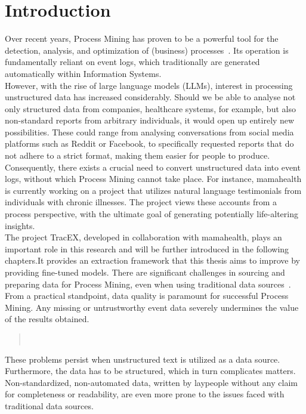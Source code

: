 \section{Introduction}\label{sec:intro}
Over recent years, Process Mining has proven to be a powerful tool for the detection, analysis, and optimization of (business) processes~\cite{weske_business_2012}. Its operation is fundamentally reliant on event logs, which traditionally are generated automatically within Information Systems.\\
However, with the rise of large language models (LLMs), interest in processing unstructured data has increased considerably. Should we be able to analyse not only structured data from companies, healthcare systems, for example, but also non-standard reports from arbitrary individuals, it would open up entirely new possibilities. These could range from analysing conversations from social media platforms such as Reddit or Facebook, to specifically requested reports that do not adhere to a strict format, making them easier for people to produce.\\
Consequently, there exists a crucial need to convert unstructured data into event logs, without which Process Mining cannot take place. For instance, mamahealth is currently working on a project that utilizes natural language testimonials from individuals with chronic illnesses. The project views these accounts from a process perspective, with the ultimate goal of generating potentially life-altering insights.\\
The project TracEX, developed in collaboration with mamahealth, plays an important role in this research and will be further introduced in the following chapters.It provides an extraction framework that this thesis aims to improve by providing fine-tuned models. There are significant challenges in sourcing and preparing data for Process Mining, even when using traditional data sources~\cite{van_der_aalst_process_2016}. From a practical standpoint, data quality is paramount for successful Process Mining. Any missing or untrustworthy event data severely undermines the value of the results obtained. 
\begin{quote}
    ~\cite{van_der_aalst_process_2016}    
\end{quote}
These problems persist when unstructured text is utilized as a data source. Furthermore, the data has to be structured, which in turn complicates matters. Non-standardized, non-automated data, written by laypeople without any claim for completeness or readability, are even more prone to the issues faced with traditional data sources.\\
